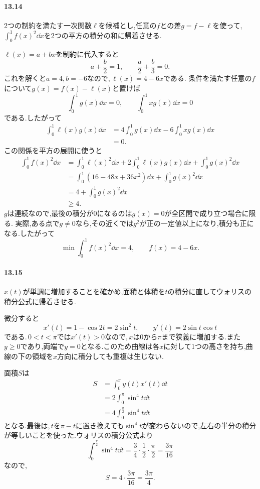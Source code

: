 \paragraph{13.14}
2つの制約を満たす一次関数$\ell$を候補とし,任意の$f$との差$g=f-\ell$を使って,\,$\int_0^1f(x)^2\dd x$を2つの平方の積分の和に帰着させる.

$\ell(x)=a+bx$を制約に代入すると
\[
 a+\frac b2=1,\qquad \frac a2+\frac b3=0.
\]
これを解くと$a=4$,\,$b=-6$なので,\,$\ell(x)=4-6x$である.
条件を満たす任意の$f$について$g(x)=f(x)-\ell(x)$と置けば
\[
 \int_0^1g(x)\dd x=0,\qquad
 \int_0^1xg(x)\dd x=0
\]
である.したがって
\[
 \begin{aligned}
 \int_0^1\ell(x)g(x)\dd x
 &=4\int_0^1g(x)\dd x-6\int_0^1xg(x)\dd x\\
 &=0.
 \end{aligned}
\]
この関係を平方の展開に使うと
\[
 \begin{aligned}
 \int_0^1f(x)^2\dd x
 &=\int_0^1\ell(x)^2\dd x
   +2\int_0^1\ell(x)g(x)\dd x+\int_0^1g(x)^2\dd x\\
 &=\int_0^1(16-48x+36x^2)\dd x+\int_0^1g(x)^2\dd x\\
 &=4+\int_0^1g(x)^2\dd x\\
 &\ge4.
 \end{aligned}
\]
$g$は連続なので,最後の積分が$0$になるのは$g(x)=0$が全区間で成り立つ場合に限る.
実際,ある点で$g\ne0$なら,その近くでは$g^2$が正の一定値以上になり,積分も正になる.したがって
\[
 \boxed{\min\int_0^1f(x)^2\dd x=4,\qquad f(x)=4-6x}.
\]

\paragraph{13.15}
$x(t)$が単調に増加することを確かめ,面積と体積を$t$の積分に直してウォリスの積分公式に帰着させる.

微分すると
\[
 x'(t)=1-\cos2t=2\sin^2t,\qquad
 y'(t)=2\sin t\cos t
\]
である.\,$0<t<\pi$では$x'(t)>0$なので,\,$x$は$0$から$\pi$まで狭義に増加する.また$y\ge0$であり,両端で$y=0$となる.このため曲線は各$x$に対して1つの高さを持ち,曲線の下の領域を$x$方向に積分しても重複は生じない.

面積$S$は
\[
 \begin{aligned}
 S&=\int_0^\pi y(t)x'(t)\dd t\\
 &=2\int_0^\pi\sin^4t\dd t\\
 &=4\int_0^{\frac\pi2}\sin^4t\dd t
 \end{aligned}
\]
となる.最後は,\,$t$を$\pi-t$に置き換えても$\sin^4t$が変わらないので,左右の半分の積分が等しいことを使った.ウォリスの積分公式より
\[
 \int_0^{\frac\pi2}\sin^4t\dd t
 =\frac34\cdot\frac12\cdot\frac\pi2=\frac{3\pi}{16}
\]
なので,
\[
 \boxed{S=4\cdot\frac{3\pi}{16}=\frac{3\pi}{4}}.
\]

